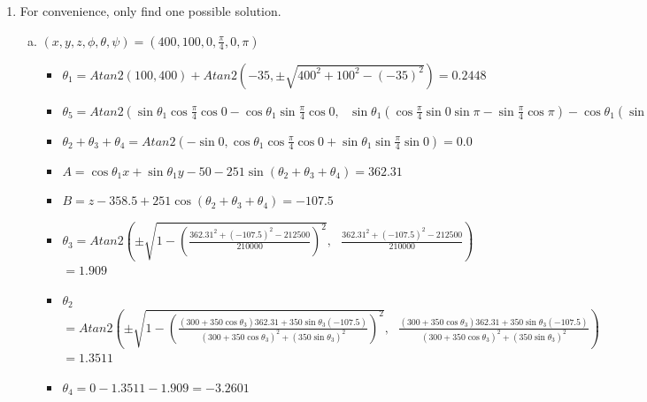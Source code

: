 \documentclass[12pt, a4paper]{article}
\begin{document}
\begin{enumerate}[(1)]
\vspace*{0cm}
Since $\theta_3$ is known, we can write $c_{23}$ as $c_2c_3 - s_2s_3$ and $s_{23}$ as $s_2c_3 + c_2s_3$
Then the above equations become \\
$300c_2 + 350(c_2c_3 - s_2s_3) = A$ \\
$300s_2 + 350(s_2c_3 + c_2s_3) = B$ \\
Multiply first equation by $(300 + 350c_3)$ and second equation by $350s_3$ and add them together, we get \\
$c_2 = \frac{(300 + 350c_3)A + 350s_3B}{(300 + 350c_3)^2 + (350s_3)^2}$ \\
So $\theta_2 = Atan2(\pm \sqrt{1 - (\frac{(300 + 350c_3)A + 350s_3B}{(300 + 350c_3)^2 + (350s_3)^2}}, \mbox{ } \frac{(300 + 350c_3)A + 350s_3B}{(300 + 350c_3)^2 + (350s_3)^2})$ \\

\vspace*{0cm}
Finally, $\theta_4$ can be calculated by $\theta_4 = (\theta_2 + \theta_3 + \theta_4) - \theta_2 - \theta_3$

\newpage
\item
For convenience, only find one possible solution.
\begin{enumerate}[(a)]

\item
$(x, y, z, \phi, \theta, \psi) = (400, 100, 0, \frac{\pi}{4}, 0, \pi)$ 
\begin{itemize}
\item
$\theta_1 = Atan2(100, 400) + Atan2(-35, \pm \sqrt{400^2 + 100^2 - (-35)^2}) = 0.2448$ 
\item
$\theta_5 = Atan2(\sin \theta_1 \cos \frac{\pi}{4} \cos 0 - \cos \theta_1 \sin \frac{\pi}{4} \cos 0, \mbox{ } \sin \theta_1(\cos\frac{\pi}{4} \sin 0 \sin\pi - \sin\frac{\pi}{4} \cos\pi) - \cos\theta_1(\sin\frac{\pi}{4} \sin0 \sin\pi + \cos\frac{\pi}{4} \cos\pi)) = -0.5406$
\item
$\theta_2 + \theta_3 + \theta_4 = Atan2(-\sin 0, \cos\theta_1 \cos\frac{\pi}{4} \cos0 + \sin\theta_1 \sin\frac{\pi}{4} \sin0) = 0.0$
\item
$A = \cos\theta_1 x + \sin\theta_1 y - 50 - 251\sin(\theta_2 + \theta_3 + \theta_4) = 362.31$
\item
$B = z - 358.5 + 251\cos(\theta_2 + \theta_3 + \theta_4) = -107.5$
\item
$\theta_3 = Atan2(\pm \sqrt{1 - (\frac{362.31^2 + (-107.5)^2 - 212500}{210000})^2}, \mbox{ } \frac{362.31^2 + (-107.5)^2 - 212500}{210000})$ \\ $=1.909$
\item
$\theta_2$ \\ $= Atan2(\pm \sqrt{1 - (\frac{(300 + 350\cos\theta_3)362.31 + 350\sin\theta_3 (-107.5)}{(300 + 350\cos\theta_3)^2 + (350\sin\theta_3)^2})^2}, \mbox{ } \frac{(300 + 350\cos\theta_3)362.31 + 350\sin\theta_3 (-107.5)}{(300 + 350\cos\theta_3)^2 + (350\sin\theta_3)^2})$ \\ $=1.3511$
\item
$\theta_4 = 0 - 1.3511 - 1.909 = -3.2601$
\end{itemize}


\end{enumerate}
\end{enumerate}
\end{document}
